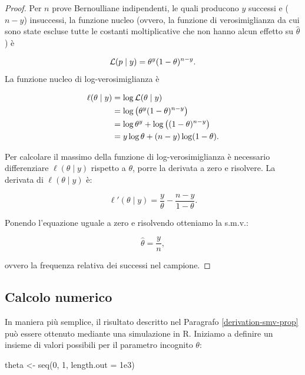 \documentclass[
  11pt,
]{krantz}
\makeatletter
\newenvironment{Shaded}{\begin{snugshade}}{\end{snugshade}}
\newcommand{\AttributeTok}[1]{\textcolor[rgb]{0.61,0.61,0.61}{#1}}
\newcommand{\DecValTok}[1]{\textcolor[rgb]{0.06,0.06,0.06}{#1}}
\newcommand{\FloatTok}[1]{\textcolor[rgb]{0.06,0.06,0.06}{#1}}
\newcommand{\FunctionTok}[1]{\textcolor[rgb]{0,0,0}{#1}}
\newcommand{\NormalTok}[1]{#1}
\newcommand{\OtherTok}[1]{\textcolor[rgb]{0.37,0.37,0.37}{#1}}
\newenvironment{kframe}{%
\medskip{}
\setlength{\fboxsep}{.8em}
 \def\at@end@of@kframe{}%
 \ifinner\ifhmode%
  \def\at@end@of@kframe{\end{minipage}}%
  \begin{minipage}{\columnwidth}%
 \fi\fi%
 \def\FrameCommand##1{\hskip\@totalleftmargin \hskip-\fboxsep
 \colorbox{shadecolor}{##1}\hskip-\fboxsep
     \hskip-\linewidth \hskip-\@totalleftmargin \hskip\columnwidth}%
 \MakeFramed {\advance\hsize-\width
   \@totalleftmargin\z@ \linewidth\hsize
   \@setminipage}}%
 {\par\unskip\endMakeFramed%
 \at@end@of@kframe}
\renewenvironment{Shaded}{\begin{kframe}}{\end{kframe}}
\newcommand{\R}{\textsf{R}} %
\theoremstyle{definition}
\theoremstyle{definition}
\theoremstyle{definition}
\theoremstyle{definition}
\theoremstyle{remark}
\makeatother
\begin{document}
\begin{proof}
Per \(n\) prove Bernoulliane indipendenti, le quali producono \(y\) successi e (\(n-y\)) insuccessi, la funzione nucleo (ovvero, la funzione di verosimiglianza da cui sono state escluse tutte le costanti moltiplicative che non hanno alcun effetto su \(\hat{\theta}\)) è

\[
\mathcal{L}(p \mid y) = \theta^y (1-\theta)^{n - y}.\notag
\] La funzione nucleo di log-verosimiglianza è

\[
\begin{aligned}
\ell(\theta \mid y) &= \log \mathcal{L}(\theta \mid y) \notag\\
          &= \log \left(\theta^y (1-\theta)^{n - y} \right) \notag\\
          &= \log \theta^y + \log \left( (1-\theta)^{n - y} \right) \notag\\
          &= y \log \theta + (n - y) \log (1-\theta).\notag
\end{aligned}
\]

Per calcolare il massimo della funzione di log-verosimiglianza è necessario differenziare \(\ell(\theta \mid y)\) rispetto a \(\theta\), porre la derivata a zero e risolvere. La derivata di \(\ell(\theta \mid y)\) è:

\[
\ell'(\theta \mid y) = \frac{y}{\theta} -\frac{n-y}{1-\theta}.
\]

Ponendo l'equazione uguale a zero e risolvendo otteniamo la s.m.v.:

\begin{equation}
  \hat{\theta} = \frac{y}{n},
  \label{eq:mlprop}
\end{equation}

ovvero la frequenza relativa dei successi nel campione.
\end{proof}

\hypertarget{calcolo-numerico}{%
\subsection*{Calcolo numerico}\label{calcolo-numerico}}


In maniera più semplice, il risultato descritto nel Paragrafo \ref{derivation-smv-prop} può essere ottenuto mediante una simulazione in \R. Iniziamo a definire un insieme di valori possibili per il parametro incognito \(\theta\):

\begin{Shaded}
\begin{Highlighting}[]
\NormalTok{theta }\OtherTok{\textless{}{-}} \FunctionTok{seq}\NormalTok{(}\DecValTok{0}\NormalTok{, }\DecValTok{1}\NormalTok{, }\AttributeTok{length.out =} \FloatTok{1e3}\NormalTok{)}
\end{Highlighting}
\end{Shaded}
\end{document}
